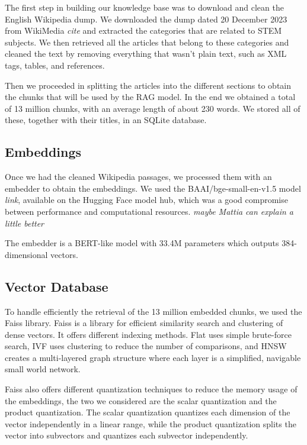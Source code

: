 \documentclass[11pt]{article}
\begin{document}
The first step in building our knowledge base was to download and clean the English
Wikipedia dump. We downloaded the dump dated 20 December 2023 from WikiMedia \textit{cite} 
and extracted the categories that are related to STEM subjects. 
We then retrieved all the articles that belong to these categories and cleaned the text
by removing everything that wasn't plain text, such as XML tags, tables, and references.

Then we proceeded in splitting the articles into the different sections to obtain the chunks 
that will be used by the RAG model. 
In the end we obtained a total of 13 million chunks, with an average length of about 230 words.
We stored all of these, together with their titles, in an SQLite database.

\subsection{Embeddings}

Once we had the cleaned Wikipedia passages, we processed them with an embedder to obtain the embeddings.
We used the BAAI/bge-small-en-v1.5 model \textit{link}, available on the Hugging Face model hub, 
which was a good compromise between performance and computational resources. 
\textit{maybe Mattia can explain a little better}

The embedder is a BERT-like model with 33.4M parameters which outputs 384-dimensional vectors.


\subsection{Vector Database}

To handle efficiently the retrieval of the 13 million embedded chunks, we used the Faiss library. 
Faiss is a library for efficient similarity search and clustering of dense vectors. 
It offers different indexing methods. Flat uses simple brute-force search, 
IVF uses clustering to reduce the number of comparisons,
and HNSW creates a multi-layered graph structure where each layer is a simplified, 
navigable small world network. 

Faiss also offers different quantization techniques to reduce the memory usage of the embeddings, 
the two we considered are the scalar quantization and the product quantization. 
The scalar quantization quantizes each dimension of the vector independently in a linear
range, while the product quantization splits the vector into subvectors and quantizes each
subvector independently.
\end{document}
